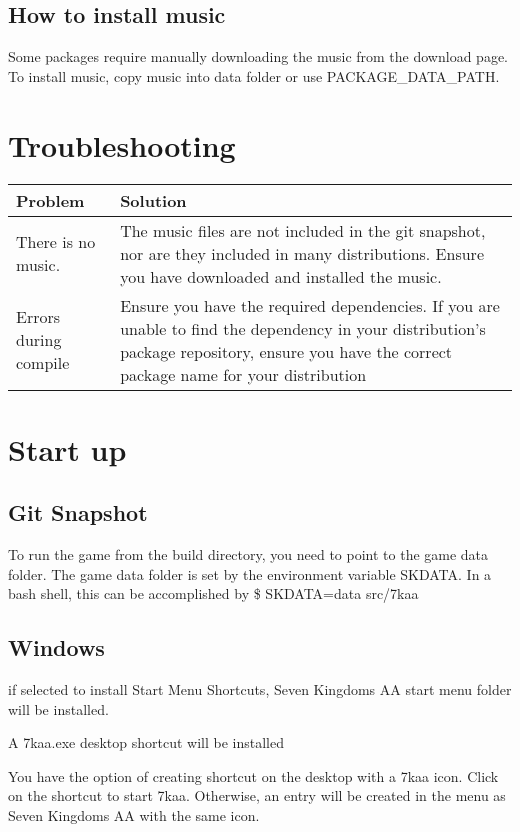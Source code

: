 \documentclass[10pt,a4paper]{article}
\begin{document}
	
	\subsection{How to install music}
	
	Some packages require manually downloading the music from the download page. To install music, copy music into data folder or use PACKAGE\_DATA\_PATH.
	
	\section{Troubleshooting}
	
	\begin{tabular}{ | l | p{6cm} |}
		\hline
		Problem	& Solution \\ \hline
		There is no music. & The music files are not included in the git snapshot, nor are they included in many distributions. Ensure you have downloaded and installed the music. \\ \hline
		Errors during compile & Ensure you have the required dependencies. If you are unable to find the dependency in your distribution's package repository, ensure you have the correct package name for your distribution \\
		\hline
	\end{tabular}
	
	\section{Start up}
	
	\subsection{Git Snapshot}
	
	To run the game from the build directory, you need to point to the game data folder. The game data folder is set by the environment variable SKDATA. In a bash shell, this can be accomplished by \$ SKDATA=data src/7kaa
	
	
	\subsection{Windows}
	
	if selected to install Start Menu Shortcuts, Seven Kingdoms AA start menu folder will be installed. 
	
	A 7kaa.exe desktop shortcut will be installed %
	
	You have the option of creating shortcut on the desktop with a 7kaa icon. Click on the shortcut to start 7kaa. Otherwise, an entry will be created in the menu as Seven Kingdoms AA with the same icon.
	
\end{document}
